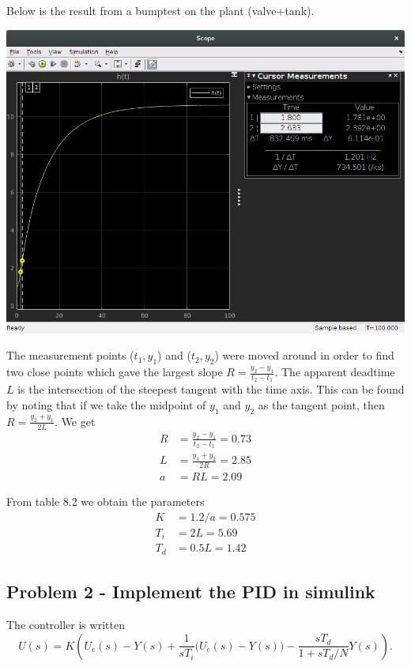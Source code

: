 \documentclass[a4paper]{scrartcl}
\begin{document}
Below is the result from a bumptest on the plant (valve+tank).
\begin{center}
\includegraphics[width=0.7\linewidth]{./figures/hw3-bumptest.png}
\end{center}
The measurement points (\(t_1, y_1\)) and (\(t_2, y_2\)) were moved around in order to find two close points which gave the largest slope \(R = \frac{y_2-y_1}{t_2-t_1}\). The apparent deadtime $L$ is the intersection of the steepest tangent with the time axis. This can be found by noting that if we take the midpoint of $y_1$ and $y_2$ as the tangent point, then $R = \frac{y_2+y_1}{2L}$. We get
\begin{align*}
R &= \frac{y_2-y_1}{t_2-t_1} = 0.73\\
L &= \frac{y_1+y_2}{2R} = 2.85\\
a &= RL = 2.09
\end{align*}

From table 8.2 we obtain the parameters
\begin{align*}
K &= 1.2/a = 0.575\\
T_i &= 2L = 5.69\\
T_d &= 0.5L = 1.42
\end{align*}

\subsection*{Problem 2 - Implement the PID in simulink}
\label{sec-3-2}

The controller is written
\[U(s) = K \left( U_c(s) - Y(s) + \frac{1}{sT_i}\big(U_c(s) - Y(s)\big) - \frac{sT_d}{1 + sT_d/N} Y(s)\right).\]
\end{document}
